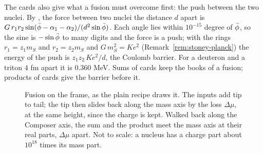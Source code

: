 The cards also give what a fusion must overcome first: the push between the two nuclei. By , the force between two nuclei the distance $d$ apart is $G\,r_1 r_2\sin(\bar{\phi} - \alpha_1 - \alpha_2)/(d^2\sin\bar{\phi})$. Each angle lies within $10^{-15}$ degree of $\bar{\phi}$, so the sine is $-\sin\bar{\phi}$ to many digits and the force is a push; with the rings $r_1 = z_1 m_S$ and $r_2 = z_2 m_S$ and $G\,m_S^2 = K e^2$ (Remark~\ref{rem:stoney-planck}) the energy of the push is $z_1 z_2\,K e^2/d$, the Coulomb barrier. For a deuteron and a triton $4$ fm apart it is $0.360$ MeV. Sums of cards keep the books of a fusion; products of cards give the barrier before it.

\begin{figure}[tb]
\myfloatalign
{}
\caption[Fusion on the frame]{Fusion on the frame, as the plain recipe draws it. The inputs add tip to tail; the tip then slides back along the mass axis by the loss $\Delta\mu$, at the same height, since the charge is kept. Walked back along the Composer axis, the sum and the product meet the mass axis at their real parts, $\Delta\mu$ apart. Not to scale: a nucleus has a charge part about $10^{18}$ times its mass part.}
\label{fig:cl-slide}
\end{figure}

